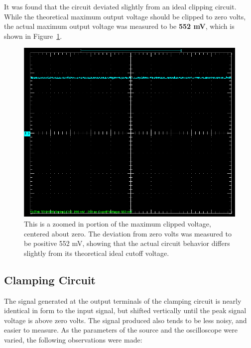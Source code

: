 \documentclass[twocolumn,english]{IEEEtran}
\begin{document}
It was found that the circuit deviated slightly from an ideal clipping circuit. While the theoretical maximum output voltage should be clipped to zero volts, the actual maximum output voltage was measured to be \textbf{552 mV}, which is shown in Figure~\ref{fig:cutoff_voltage}.
\begin{figure}[h]
  \begin{centering}
  \begin{center}
  \includegraphics[width=\linewidth]{./Cutoff_Voltage.png}
  \caption{This is a zoomed in portion of the maximum clipped voltage, centered about zero. The deviation from zero volts was measured to be positive 552 mV, showing that the actual circuit behavior differs slightly from its theoretical ideal cutoff voltage.}
  \label{fig:cutoff_voltage}
  \end{center}
  \par\end{centering}
\end{figure}

\noindent\hrulefill
\subsection{\textbf{Clamping Circuit}}
The signal generated at the output terminals of the clamping circuit is nearly identical in form to the input signal, but shifted vertically until the peak signal voltage is above zero volts. The signal produced also tends to be less noisy, and easier to measure. As the parameters of the source and the oscilloscope were varied, the following observations were made:
\end{document}
